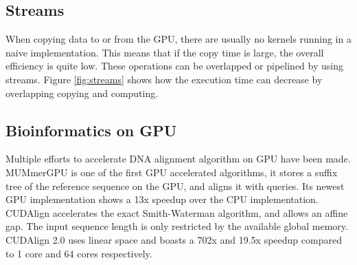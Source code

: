 \documentclass[../main/thesis.tex]{subfiles}
\begin{document}


\subsection{Streams}
When copying data to or from the GPU, there are usually no kernels running in a naive implementation.
This means that if the copy time is large, the overall efficiency is quite low.
These operations can be overlapped or pipelined by using streams. Figure \ref{fig:streams} shows how the execution time can decrease by overlapping copying and computing.








\subsection{Bioinformatics on GPU}


Multiple efforts to accelerate DNA alignment algorithm on GPU have been made.
MUMmerGPU \cite{MUMmerGPU}\cite{MUMmerGPU2} is one of the first GPU accelerated algorithms, it stores a suffix tree of the reference sequence on the GPU, and aligns it with queries.
Its newest GPU implementation shows a 13x speedup over the CPU implementation.
CUDAlign \cite{CUDAlign} accelerates the exact Smith-Waterman algorithm, and allows an affine gap.
The input sequence length is only restricted by the available global memory.
CUDAlign 2.0 \cite{CUDAlign2} uses linear space and boasts a 702x and 19.5x speedup compared to 1 core and 64 cores respectively.
\end{document}
